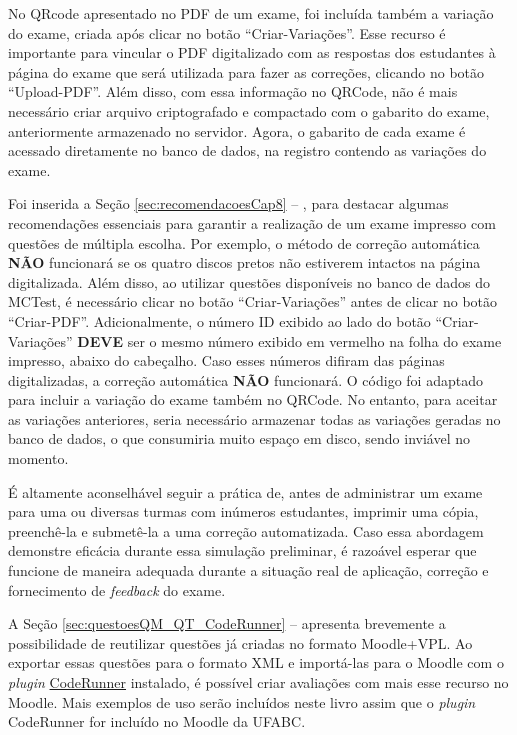No QRcode apresentado no PDF de um exame, foi incluída também a variação do exame, criada após clicar no botão ``Criar-Variações''. Esse recurso é importante para vincular o PDF digitalizado com as respostas dos estudantes à página do exame que será utilizada para fazer as correções, clicando no botão ``Upload-PDF''. Além disso, com essa informação no QRCode, não é mais necessário criar arquivo criptografado e compactado com o gabarito do exame, anteriormente armazenado no servidor. Agora, o gabarito de cada exame é acessado diretamente no banco de dados, na registro contendo as variações do exame.

Foi inserida a Seção \ref{sec:recomendacoesCap8} -- , para destacar algumas recomendações essenciais para garantir a realização de um exame impresso com questões de múltipla escolha. Por exemplo, o método de correção automática \textbf{NÃO} funcionará se os quatro discos pretos não estiverem intactos na página digitalizada. Além disso, ao utilizar questões disponíveis no banco de dados do MCTest, é necessário clicar no botão ``Criar-Variações'' antes de clicar no botão ``Criar-PDF''. Adicionalmente, o número ID exibido ao lado do botão ``Criar-Variações'' \textbf{DEVE} ser o mesmo número exibido em vermelho na folha do exame impresso, abaixo do cabeçalho. Caso esses números difiram das páginas digitalizadas, a correção automática \textbf{NÃO} funcionará. O código foi adaptado para incluir a variação do exame também no QRCode. No entanto, para aceitar as variações anteriores, seria necessário armazenar todas as variações geradas no banco de dados, o que consumiria muito espaço em disco, sendo inviável no momento.

É altamente aconselhável seguir a prática de, antes de administrar um exame para uma ou diversas turmas com inúmeros estudantes, imprimir uma cópia, preenchê-la e submetê-la a uma correção automatizada. Caso essa abordagem demonstre eficácia durante essa simulação preliminar, é razoável esperar que funcione de maneira adequada durante a situação real de aplicação, correção e fornecimento de \textit{feedback} do exame.
 
A Seção \ref{sec:questoesQM_QT_CodeRunner} –  apresenta brevemente a possibilidade de reutilizar questões já criadas no formato Moodle+VPL. Ao exportar essas questões para o formato XML e importá-las para o Moodle com o \textit{plugin} \href{https://moodle.org/plugins/qtype_coderunner}{CodeRunner} instalado, é possível criar avaliações com mais esse recurso no Moodle. Mais exemplos de uso serão incluídos neste livro assim que o \textit{plugin} CodeRunner for incluído no Moodle da UFABC.


